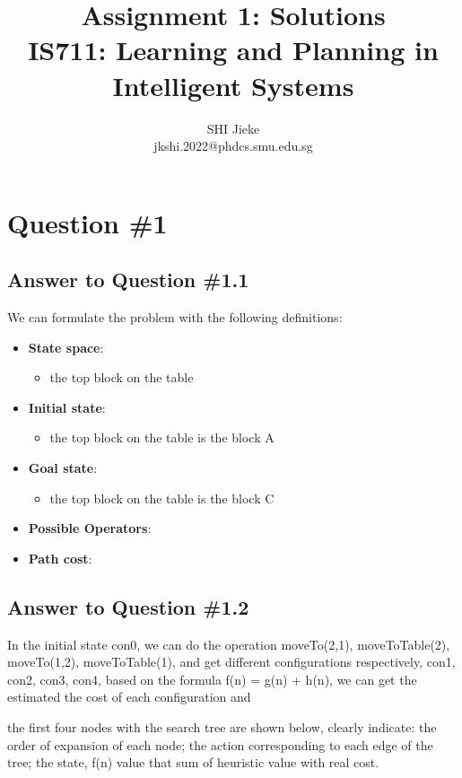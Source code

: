 \documentclass[conference]{styles/acmsiggraph}
\title{Assignment 1: Solutions \\ {IS711: Learning and Planning in Intelligent Systems}}
\author{SHI Jieke \\ jkshi.2022@phdcs.smu.edu.sg}
\begin{document}
\maketitle
\vspace{-0.15cm}
\section{Question \#1}

\subsection{Answer to Question \#1.1}

We can formulate the problem with the following definitions:
\begin{itemize}[leftmargin=*]
	\item \textbf{State space}:
		\begin{itemize}
			\item the top block on the table
		\end{itemize} 
	\item \textbf{Initial state}:
		\begin{itemize}
			\item the top block on the table is the block A
		\end{itemize}
	\item \textbf{Goal state}:
		\begin{itemize}
			\item the top block on the table is the block C
		\end{itemize}
	\item \textbf{Possible Operators}:
	\item \textbf{Path cost}:
\end{itemize}

\subsection{Answer to Question \#1.2}
In the initial state con0, we can do the operation moveTo(2,1), moveToTable(2), moveTo(1,2), 
moveToTable(1), and get different configurations respectively, con1, con2, con3, con4, based 
on the formula f(n) = g(n) + h(n), we can get the estimated the cost of each configuration and 

the first four nodes with the search tree are shown below, clearly indicate: 
the order of expansion of each node; 
the action corresponding to each edge of the tree; 
the state, 
f(n) value that sum of heuristic value with real cost.
\end{document}
